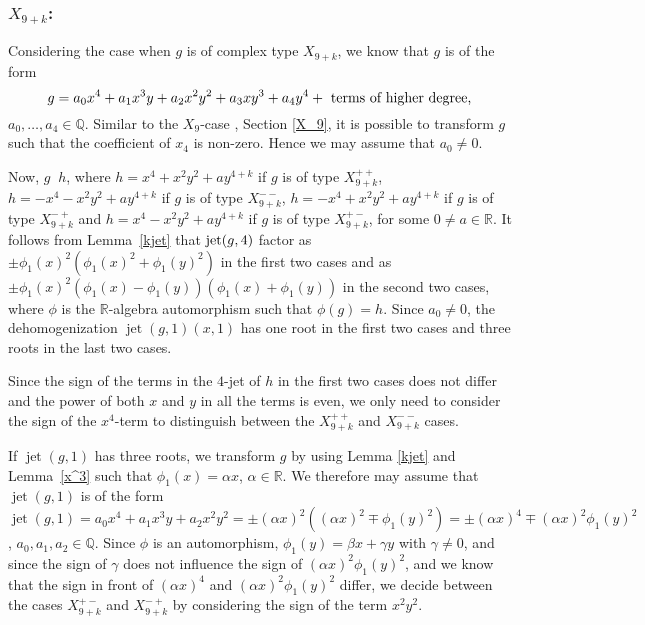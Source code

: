 \documentclass[noend]{amsproc}
\DeclareMathOperator{\requiv}{\overset{r}{\sim}}
\DeclareMathOperator{\jt}{jet}
\begin{document}
\subsubsection{$X_{9+k}$:}Considering the case when $g$ is of complex type $X_{9+k}$, we know that $g$ is
of the
form
\[
g=a_0x^4+a_1x^3y+a_2x^2y^2+a_3xy^3+a_4y^4+\textnormal{ terms of higher degree,}
\]
$a_0,\ldots,a_4\in\mathbb Q$.
Similar to the $X_9$-case , Section \ref{X_9}, it is possible to transform $g$ such that the coefficient of $x_4$ is non-zero. Hence we may assume that $a_0\neq 0$.

Now, $g\requiv h$, where $h=x^4+x^2y^2+ay^{4+k}$ if $g$ is of type
$X_{9+k}^{++}$, $h=-x^4-x^2y^2+ay^{4+k}$ if $g$ is of type $X_{9+k}^{--}$,
$h=-x^4+x^2y^2+ay^{4+k}$ if $g$ is of type $X_{9+k}^{-+}$ and
$h=x^4-x^2y^2+ay^{4+k}$ if $g$ is of type $X_{9+k}^{+-}$, for some
$0\neq a\in\mathbb R$.  It follows
from Lemma~\ref{kjet} that $\textnormal{jet}(g,4)$ factor as
$\pm\phi_1(x)^2(\phi_1(x)^2+\phi_1(y)^2)$ in the first two cases and as
$\pm\phi_1(x)^2(\phi_1(x)-\phi_1(y))(\phi_1(x)+\phi_1(y))$ in the second two
cases, where $\phi$ is the $\mathbb R$-algebra automorphism such that
$\phi(g)=h$. Since $a_0\neq 0$,  the dehomogenization $\jt(g,1)(x,1)$ has one
root in the first two
cases and
three roots in the last two cases.

Since the sign of the terms in the $4$-jet of $h$ in the first two cases
does not differ and the power of both $x$ and $y$ in all the terms is even,
we only need to consider the sign of the $x^4$-term to distinguish between
the $X_{9+k}^{++}$ and $X_{9+k}^{--}$ cases.

If $\jt(g,1)$ has three roots, we transform $g$ by using Lemma \ref{kjet}
and Lemma~\ref{x^3} such that $\phi_1(x)=\alpha x$, $\alpha\in\mathbb R$. We therefore may assume that
$\jt(g,1)$ is of the form
$\jt(g,1)=a_0x^4+a_1x^3y+a_2x^2y^2=\pm(\alpha x)^2((\alpha
x)^2\mp\phi_1(y)^2)=\pm(\alpha x)^4\mp (\alpha x)^2\phi_1(y)^2$,
$a_0,a_1,a_2\in\mathbb Q$. Since
$\phi$ is
an automorphism, $\phi_1(y)=\beta x+\gamma y$ with $\gamma \neq 0$,
and since the sign of $\gamma$ does not influence the sign of $(\alpha
x)^2\phi_1(y)^2$, and we know that the sign in front of $(\alpha x)^4$
and $(\alpha x)^2\phi_1(y)^2$ differ, we decide between the cases
$X_{9+k}^{+-}$ and $X_{9+k}^{-+}$ by considering the sign of the term $x^2y^2$.
\end{document}
